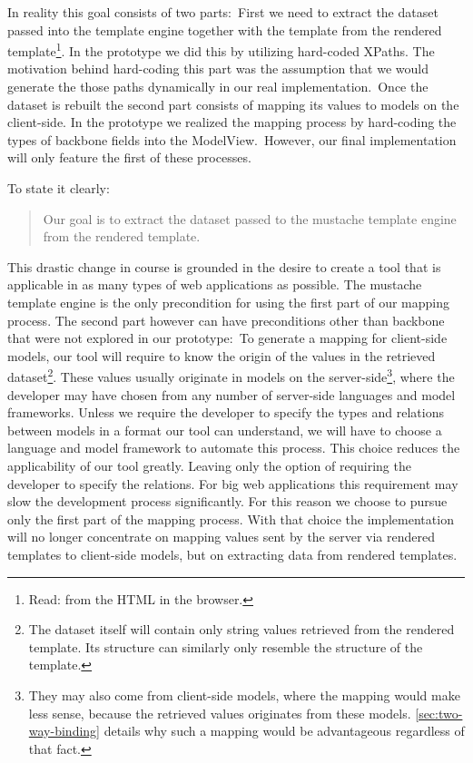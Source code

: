 \documentclass[thesis.tex]{subfiles}
\begin{document}
In reality this goal consists of two parts:\
First we need to extract the dataset passed into the template engine together
with the template from the rendered template\footnote{Read: from the HTML in the
browser.}.
In the prototype we did this by utilizing hard-coded XPaths. The motivation
behind hard-coding this part was the assumption that we would generate the those
paths dynamically in our real implementation.\
Once the dataset is rebuilt the second part consists of mapping its values
to models on the client-side. In the prototype we realized the mapping process
by hard-coding the types of backbone fields into the ModelView.\
However, our final implementation will only feature the first of these
processes.

To state it clearly:
\begin{quote}
Our goal is to extract the dataset passed to the mustache template engine from
the rendered template.
\end{quote}

This drastic change in course is grounded in the desire to create a tool that
is applicable in as many types of web applications as possible.
The mustache template engine is the only precondition for using the first part
of our mapping process. The second part however can have preconditions
other than backbone that were not explored in our prototype:\
To generate a mapping for client-side models, our tool will require to know the
origin of the values in the retrieved dataset\footnote{
	The dataset itself will contain only string values retrieved from the rendered
	template. Its structure can similarly only resemble the structure of the
	template.
}. These values usually originate in models on the server-side\footnote{
	They may also come from client-side models, where the mapping would make less
	sense, because the retrieved values originates from these models.
	\ref{sec:two-way-binding} details why such a mapping would be advantageous
	regardless of that fact.
}, where the developer may have chosen from any number of server-side languages
and model frameworks. Unless we require the developer to specify the types and
relations between models in a format our tool can understand, we will have to
choose a language and model framework to automate this process. This choice
reduces the applicability of our tool greatly. Leaving only the option of
requiring the developer to specify the relations. For big web applications this
requirement may slow the development process significantly.
For this reason we choose to pursue only the first part of the mapping process.
With that choice the implementation will no longer concentrate on mapping values
sent by the server via rendered templates to client-side models,
but on extracting data from rendered templates.
\end{document}
